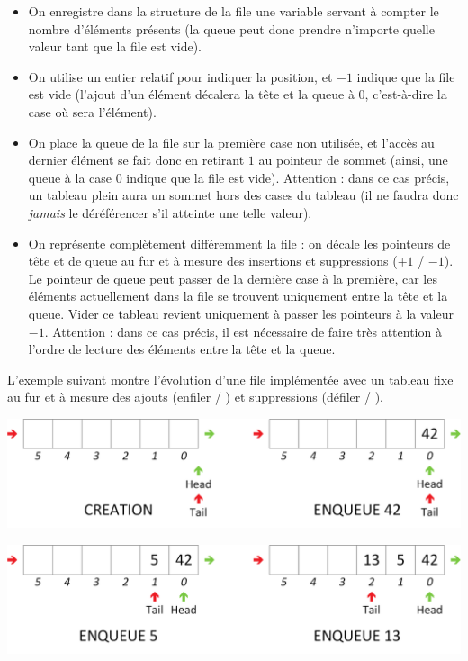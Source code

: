 \begin{itemize}
\item On enregistre dans la structure de la file une variable servant à compter le nombre d'éléments présents (la queue peut donc prendre n'importe quelle valeur tant que la file est vide).
\item On utilise un entier relatif pour indiquer la position, et $ -1 $ indique que la file est vide (l'ajout d'un élément décalera la tête et la queue à $ 0 $, c'est-à-dire la case où sera l'élément).
\item On place la queue de la file sur la première case non utilisée, et l'accès au dernier élément se fait donc en retirant $ 1 $ au pointeur de sommet (ainsi, une queue à la case $ 0 $ indique que la file est vide).
Attention : dans ce cas précis, un tableau plein aura un sommet hors des cases du tableau (il ne faudra donc \textit{jamais} le déréférencer s'il atteinte une telle valeur).
\item On représente complètement différemment la file : on décale les pointeurs de tête et de queue au fur et à mesure des insertions et suppressions ($ +1 $ / $ -1 $). Le pointeur de queue peut passer de la dernière case à la première, car les éléments actuellement dans la file se trouvent uniquement entre la tête et la queue.
Vider ce tableau revient uniquement à passer les pointeurs à la valeur $ -1 $.
Attention : dans ce cas précis, il est nécessaire de faire très attention à l'ordre de lecture des éléments entre la tête et la queue.
\end{itemize}

\smallskip

L'exemple suivant montre l'évolution d'une file implémentée avec un tableau fixe au fur et à mesure des ajouts (enfiler / ) et suppressions (défiler / ).\\

\begin{center}
\includegraphics[scale=0.65]{Cours/Files_6_Tableau_Statique_Usage_pack_1.png}
\end{center}

\begin{center}
\includegraphics[scale=0.65]{Cours/Files_6_Tableau_Statique_Usage_pack_2.png}
\end{center}

